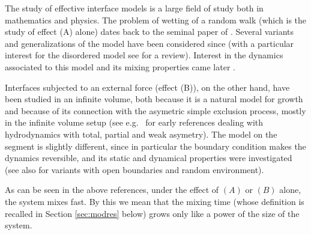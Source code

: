 \documentclass[reqno,11pt]{amsart}
\numberwithin{equation}{section}
\begin{document}
\medskip


The study of effective interface models is a large field of study both in mathematics and physics.
The problem of wetting of a random walk (which is the study of effect (A) alone) dates back to the seminal paper of \cite{fisher1984walks}. Several variants and generalizations of the model have been considered since (with a particular interest for the disordered model see 
  \cite{GiacominPolymerLNM, GiacominPolymerbk} for a review).
Interest in the dynamics associated to this model and its mixing properties came later \cite{caputo2008approach, caputo2012polymer, yang2019cutoff}.
  
\medskip  

Interfaces subjected to an external force (effect (B)), on the other hand, have been studied in an infinite volume, both because it is a natural model for growth and because of its connection with the asymetric simple exclusion process, mostly in the infinite volume setup (see e.g.\ \cite{Rost81,rez91, Demasi89, GART88} for early references dealing with hydrodynamics  with total, partial and weak asymetry).
The model on the segment is slightly different, since in particular the boundary condition makes the dynamics reversible, and its static and dynamical properties were investigated \cite{benjamini2005mixing, LabbeWABridge, labbe2016cutoff, labbe2018mixing, LevPer16} (see also \cite{gns2020, schmid2019mixing} for variants with open boundaries and random environment).
  
  
\medskip

As can be seen in the above references, under the effect of $(A)$ or $(B)$ alone, the system mixes fast. By this we mean that the mixing time (whose definition is recalled in Section \ref{sec:modres} below) grows only like a power of the size of the system.


\medskip
\end{document}
